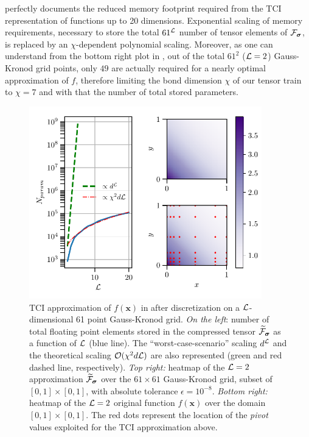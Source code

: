 \begin{example}
 perfectly documents the reduced memory footprint required from the TCI representation of functions up to 20 dimensions. Exponential scaling of memory requirements, necessary to store the total $61^{\mathcal{L}}$ number of tensor elements of $\mathcal{F}_{\boldsymbol{\sigma}}$, is replaced by an $\chi$-dependent polynomial scaling. Moreover, as one can understand from the bottom right plot in , out of the total $61^2$ ($\mathcal{L}=2$) Gauss-Kronod grid points, only $49$ are actually required for a nearly optimal approximation of $f$, therefore limiting the bond dimension $\chi$ of our tensor train to $\chi = 7$ and with that the number of total stored parameters. 
\begin{figure}[ht!]
		\centering
		\includegraphics[width=0.9\textwidth]{figures/TCI_memory_scaling+heatmap.pdf}
		\caption{TCI approximation of $f(\boldsymbol{x})$ in  after discretization on a $\mathcal{L}$-dimensional 61 point Gauss-Kronod grid. \textit{On the left}: number of total floating point elements stored in the compressed tensor $\widetilde{\mathcal{F}}_{\boldsymbol{\sigma}}$ as a function of $\mathcal{L}$ (blue line). The ``worst-case-scenario'' scaling $d^{\mathcal{L}}$ and the theoretical scaling $\mathcal{O} (\chi^2d\mathcal{L})$ are also represented (green and red dashed line, respectively). \textit{Top right:} heatmap of the $\mathcal{L} = 2$ approximation $\widetilde{\mathcal{F}}_{\boldsymbol{\sigma}}$ over the $61\times61$ Gauss-Kronod grid, subset of $[0,1]\times[0,1]$, with absolute tolerance $\epsilon = 10^{-8}$. \textit{Bottom right:} heatmap of the $\mathcal{L} = 2$ original function  $f(\boldsymbol{x})$ over the domain $[0,1]\times[0,1]$. The red dots represent the location of the \textit{pivot} values exploited for the TCI approximation above.
		}
		\label{fig:TCIscaling}
	\end{figure}
\label{ex:Ldimfunc}
\end{example}

